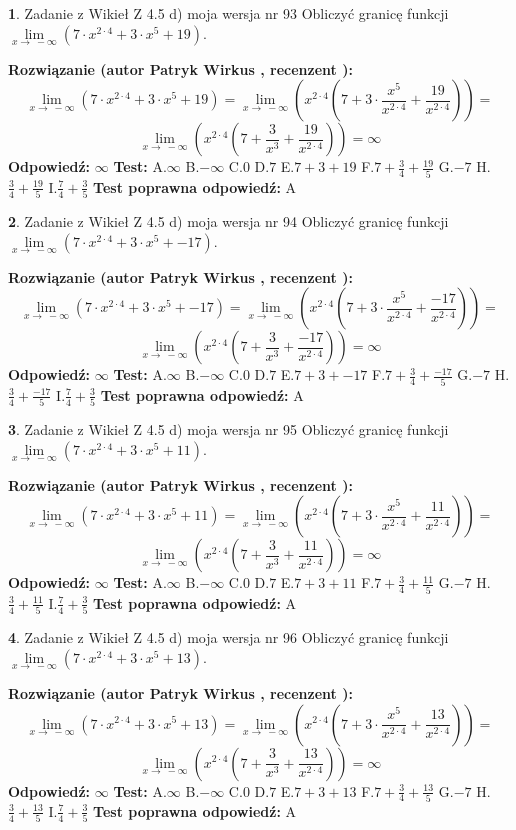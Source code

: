 \documentclass[12pt, a4paper]{article}
\theoremstyle{definition} %
\newtheorem{zad}{}
\newcommand{\zadStart}[1]{\begin{zad}#1\newline}
\newcommand{\zadStop}{\end{zad}}
\newcommand{\rozwStart}[2]{\noindent \textbf{Rozwiązanie (autor #1 , recenzent #2): }\newline}
\newcommand{\rozwStop}{\newline}
\newcommand{\odpStart}{\noindent \textbf{Odpowiedź:}\newline}
\newcommand{\odpStop}{\newline}
\newcommand{\testStart}{\noindent \textbf{Test:}\newline}
\newcommand{\testStop}{\newline}
\newcommand{\kluczStart}{\noindent \textbf{Test poprawna odpowiedź:}\newline}
\newcommand{\kluczStop}{\newline}
\begin{document}
\zadStart{Zadanie z Wikieł Z 4.5 d) moja wersja nr 93}
Obliczyć granicę funkcji  $\lim\limits_{x\to\ -\infty}(7 \cdot x^{2\cdot4}+3 \cdot x^{5}+19)$.
\zadStop
\rozwStart{Patryk Wirkus}{}
$$\lim\limits_{x\to\ -\infty}(7 \cdot x^{2\cdot4}+3 \cdot x^{5}+19) = \lim\limits_{x\to\ -\infty}(x^{2\cdot4}(7 +3 \cdot \frac{x^{5}}{x^{2\cdot4}}+\frac{19}{x^{2\cdot4}})) =$$ $$\lim\limits_{x\to\ -\infty}(x^{2\cdot4}(7 +\frac{3}{x^{3}}+\frac{19}{x^{2\cdot4}})) =\infty$$
\rozwStop
\odpStart
$\infty$
\odpStop
\testStart
A.$\infty$ B.$-\infty$ C.$0$ D.$7$ E.$7 + 3 + 19$
F.$7+\frac{3}{4}+\frac{19}{5}$ G.$-7$
H.$\frac{3}{4}+\frac{19}{5}$
I.$\frac{7}{4}+\frac{3}{5}$
\testStop
\kluczStart
A
\kluczStop



\zadStart{Zadanie z Wikieł Z 4.5 d) moja wersja nr 94}
Obliczyć granicę funkcji  $\lim\limits_{x\to\ -\infty}(7 \cdot x^{2\cdot4}+3 \cdot x^{5}+-17)$.
\zadStop
\rozwStart{Patryk Wirkus}{}
$$\lim\limits_{x\to\ -\infty}(7 \cdot x^{2\cdot4}+3 \cdot x^{5}+-17) = \lim\limits_{x\to\ -\infty}(x^{2\cdot4}(7 +3 \cdot \frac{x^{5}}{x^{2\cdot4}}+\frac{-17}{x^{2\cdot4}})) =$$ $$\lim\limits_{x\to\ -\infty}(x^{2\cdot4}(7 +\frac{3}{x^{3}}+\frac{-17}{x^{2\cdot4}})) =\infty$$
\rozwStop
\odpStart
$\infty$
\odpStop
\testStart
A.$\infty$ B.$-\infty$ C.$0$ D.$7$ E.$7 + 3 + -17$
F.$7+\frac{3}{4}+\frac{-17}{5}$ G.$-7$
H.$\frac{3}{4}+\frac{-17}{5}$
I.$\frac{7}{4}+\frac{3}{5}$
\testStop
\kluczStart
A
\kluczStop



\zadStart{Zadanie z Wikieł Z 4.5 d) moja wersja nr 95}
Obliczyć granicę funkcji  $\lim\limits_{x\to\ -\infty}(7 \cdot x^{2\cdot4}+3 \cdot x^{5}+11)$.
\zadStop
\rozwStart{Patryk Wirkus}{}
$$\lim\limits_{x\to\ -\infty}(7 \cdot x^{2\cdot4}+3 \cdot x^{5}+11) = \lim\limits_{x\to\ -\infty}(x^{2\cdot4}(7 +3 \cdot \frac{x^{5}}{x^{2\cdot4}}+\frac{11}{x^{2\cdot4}})) =$$ $$\lim\limits_{x\to\ -\infty}(x^{2\cdot4}(7 +\frac{3}{x^{3}}+\frac{11}{x^{2\cdot4}})) =\infty$$
\rozwStop
\odpStart
$\infty$
\odpStop
\testStart
A.$\infty$ B.$-\infty$ C.$0$ D.$7$ E.$7 + 3 + 11$
F.$7+\frac{3}{4}+\frac{11}{5}$ G.$-7$
H.$\frac{3}{4}+\frac{11}{5}$
I.$\frac{7}{4}+\frac{3}{5}$
\testStop
\kluczStart
A
\kluczStop



\zadStart{Zadanie z Wikieł Z 4.5 d) moja wersja nr 96}
Obliczyć granicę funkcji  $\lim\limits_{x\to\ -\infty}(7 \cdot x^{2\cdot4}+3 \cdot x^{5}+13)$.
\zadStop
\rozwStart{Patryk Wirkus}{}
$$\lim\limits_{x\to\ -\infty}(7 \cdot x^{2\cdot4}+3 \cdot x^{5}+13) = \lim\limits_{x\to\ -\infty}(x^{2\cdot4}(7 +3 \cdot \frac{x^{5}}{x^{2\cdot4}}+\frac{13}{x^{2\cdot4}})) =$$ $$\lim\limits_{x\to\ -\infty}(x^{2\cdot4}(7 +\frac{3}{x^{3}}+\frac{13}{x^{2\cdot4}})) =\infty$$
\rozwStop
\odpStart
$\infty$
\odpStop
\testStart
A.$\infty$ B.$-\infty$ C.$0$ D.$7$ E.$7 + 3 + 13$
F.$7+\frac{3}{4}+\frac{13}{5}$ G.$-7$
H.$\frac{3}{4}+\frac{13}{5}$
I.$\frac{7}{4}+\frac{3}{5}$
\testStop
\kluczStart
A
\kluczStop
\end{document}
